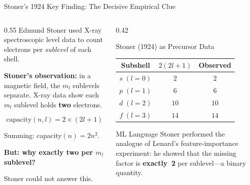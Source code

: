 \documentclass[aspectratio=169,12pt]{beamer}
\begin{document}
\begin{frame}[shrink=15]{Stoner's 1924 Key Finding: The Decisive Empirical Clue}

\begin{columns}[T]
\begin{column}{0.55\textwidth}
Edmund Stoner used X-ray spectroscopic level data to count electrons
per \emph{sublevel} of each shell.

\bigskip
\textbf{Stoner's observation:} in a magnetic field, the $m_l$ sublevels
separate.  X-ray data show each $m_l$ sublevel holds \textbf{two} electrons.

\bigskip
\[
  \text{capacity}(n,l) = 2\times(2l+1)
\]

Summing: capacity$(n) = 2n^2$.~\checkmark

\bigskip
\textbf{But: why exactly two per $m_l$ sublevel?}

Stoner could not answer this.
\end{column}
\begin{column}{0.42\textwidth}
\begin{alertblock}{Stoner (1924) as Precursor Data}
\begin{tabular}{ccc}
\toprule
Subshell & $2(2l+1)$ & Observed \\
\midrule
$s\;(l=0)$ & $2$ & $2$ \\
$p\;(l=1)$ & $6$ & $6$ \\
$d\;(l=2)$ & $10$ & $10$ \\
$f\;(l=3)$ & $14$ & $14$ \\
\bottomrule
\end{tabular}
\end{alertblock}

\bigskip
\begin{block}{ML Language}
Stoner performed the analogue of Lenard's
feature-importance experiment: he showed
that the missing factor is \textbf{exactly~2}
per sublevel---a binary quantity.
\end{block}
\end{column}
\end{columns}

\end{frame}
\end{document}
